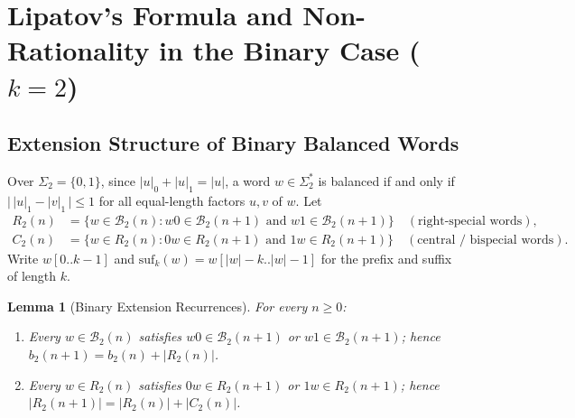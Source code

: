 \documentclass[11pt,a4paper]{article}
\newtheorem{lemma}[theorem]{Lemma}
\theoremstyle{definition}
\begin{document}
\section{Lipatov's Formula and Non-Rationality in the Binary Case (\texorpdfstring{$k = 2$}{k = 2})}

\subsection{Extension Structure of Binary Balanced Words}
Over $\Sigma_2 = \{0, 1\}$, since $|u|_0 + |u|_1 = |u|$, a word $w \in \Sigma_2^*$ is balanced if and only if $\bigl|\,|u|_1 - |v|_1\,\bigr| \le 1$ for all equal-length factors $u, v$ of $w$. Let
\begin{align*}
  R_2(n) &= \{w \in \mathcal{B}_2(n) : w0 \in \mathcal{B}_2(n+1) \text{ and } w1 \in \mathcal{B}_2(n+1)\} \quad (\text{right-special words}),\\
  C_2(n) &= \{w \in R_2(n) : 0w \in R_2(n+1) \text{ and } 1w \in R_2(n+1)\} \quad (\text{central / bispecial words}).
\end{align*}
Write $w[0..k-1]$ and $\mathrm{suf}_k(w) = w[|w|-k..|w|-1]$ for the prefix and suffix of length $k$.

\begin{lemma}[Binary Extension Recurrences]
\label{lem:bin-ext}
For every $n \ge 0$:
\begin{enumerate}
  \item Every $w \in \mathcal{B}_2(n)$ satisfies $w0 \in \mathcal{B}_2(n+1)$ or $w1 \in \mathcal{B}_2(n+1)$; hence $b_2(n+1) = b_2(n) + |R_2(n)|$.
  \item Every $w \in R_2(n)$ satisfies $0w \in R_2(n+1)$ or $1w \in R_2(n+1)$; hence $|R_2(n+1)| = |R_2(n)| + |C_2(n)|$.
\end{enumerate}
\end{lemma}
\end{document}
